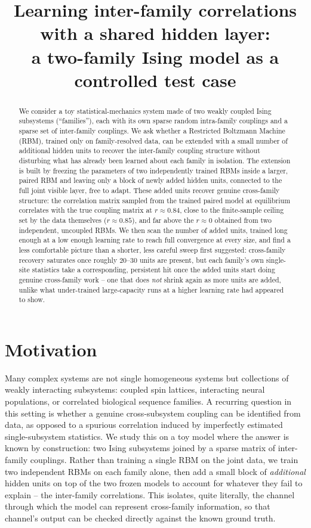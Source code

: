 \documentclass[11pt]{article}
\title{Learning inter-family correlations with a shared hidden layer:\\
a two-family Ising model as a controlled test case}
\author{}
\date{}
\begin{document}
\maketitle

\begin{abstract}
We consider a toy statistical-mechanics system made of two weakly coupled
Ising subsystems (``families''), each with its own sparse random
intra-family couplings and a sparse set of inter-family couplings. We ask
whether a Restricted Boltzmann Machine (RBM), trained only on
family-resolved data, can be extended with a small number of additional
hidden units to recover the inter-family coupling structure without
disturbing what has already been learned about each family in isolation.
The extension is built by freezing the parameters of two independently
trained RBMs inside a larger, paired RBM and leaving only a block of newly
added hidden units, connected to the full joint visible layer, free to
adapt. These added units recover genuine cross-family structure: the
correlation matrix sampled from the trained paired model at equilibrium
correlates with the true coupling matrix at $r\approx0.84$, close to the
finite-sample ceiling set by the data themselves ($r\approx0.85$), and far
above the $r\approx0$ obtained from two independent, uncoupled RBMs. We
then scan the number of added units, trained long enough at a low enough
learning rate to reach full convergence at every size, and find a less
comfortable picture than a shorter, less careful sweep first suggested:
cross-family recovery saturates once roughly $20$--$30$ units are present,
but each family's own single-site statistics take a corresponding,
persistent hit once the added units start doing genuine cross-family work
-- one that does \emph{not} shrink again as more units are added, unlike
what under-trained large-capacity runs at a higher learning rate had
appeared to show.
\end{abstract}

\section{Motivation}

Many complex systems are not single homogeneous systems but collections
of weakly interacting subsystems: coupled spin lattices, interacting
neural populations, or correlated biological sequence families. A
recurring question in this setting is whether a genuine cross-subsystem
coupling can be identified from data, as opposed to a spurious
correlation induced by imperfectly estimated single-subsystem statistics.
We study this on a toy model where the answer is known by construction:
two Ising subsystems joined by a sparse matrix of inter-family couplings.
Rather than training a single RBM on the joint data, we train two
independent RBMs on each family alone, then add a small block of
\emph{additional} hidden units on top of the two frozen models to account
for whatever they fail to explain -- the inter-family correlations. This
isolates, quite literally, the channel through which the model can
represent cross-family information, so that channel's output can be
checked directly against the known ground truth.
\end{document}
